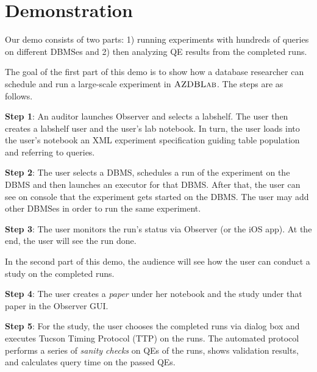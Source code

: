 \documentclass{vldb}
\def\azdb{\hbox{\sc AZDBLab}}
\begin{document}

\section{Demonstration}\label{sec:demo_overview} 
Our demo consists of two parts: 1) running experiments with hundreds of queries on different \hbox{DBMSes} and 2) then analyzing QE 
results from the completed runs. 

The goal of the first part of this demo is to show how a database \hbox{researcher} can schedule and run a large-scale experiment in $\azdb$. 
The steps are as follows.


{\bf Step 1}: An auditor launches \hbox{Observer} and selects a \linebreak \hbox{labshelf}. 
The user then creates a \hbox{labshelf} user and the user's lab notebook. 
In turn, the user loads into the user's \hbox{notebook} an XML experiment specification guiding table population and referring to queries. 

{\bf Step 2}: The user selects a \hbox{DBMS}, schedules a run of the \hbox{experiment} on the \hbox{DBMS} and then launches an executor for that DBMS. 
After that, the user can see on console that the experiment gets started on the DBMS. 
The user may add other \hbox{DBMSes} in order to run the same experiment.

{\bf Step 3}: The user monitors the run's status via \hbox{Observer} (or the \hbox{iOS} app). At the end, the user will see the run done. 

In the second part of this demo, the audience will see how the user can conduct a study on the completed runs. %

{\bf Step 4}: The user creates a {\em paper} under her notebook and the study under that paper in the \hbox{Observer} \hbox{GUI}.

{\bf Step 5}: For the study, the user chooses the completed runs via dialog box and 
executes \hbox{Tucson} \hbox{Timing} \hbox{Protocol} (\hbox{TTP}) on the runs. 
The automated protocol performs a \hbox{series} of {\em sanity checks} on QEs of the runs, shows \hbox{validation} results, and calculates query time on the passed QEs. 
\end{document}
